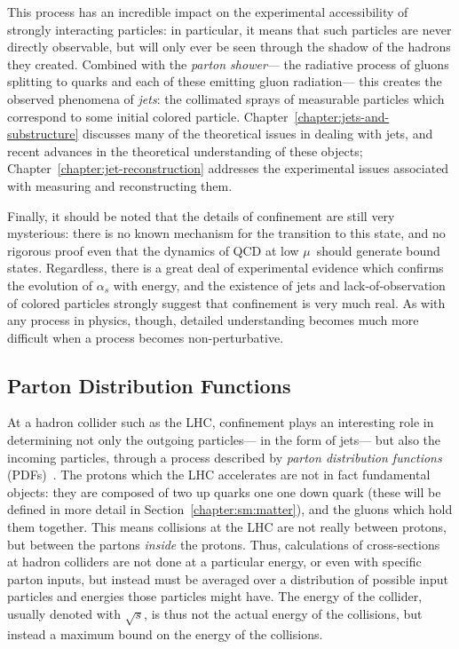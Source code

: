 This process has an incredible impact on the experimental accessibility of strongly interacting particles: in particular, it means that such particles are never directly observable, but will only ever be seen through the shadow of the hadrons they created. Combined with the \textit{parton shower}--- the radiative process of gluons splitting to quarks and each of these emitting gluon radiation--- this creates the observed phenomena of \textit{jets}: the collimated sprays of measurable particles which correspond to some initial colored particle. Chapter~\ref{chapter:jets-and-substructure} discusses many of the theoretical issues in dealing with jets, and recent advances in the theoretical understanding of these objects; Chapter~\ref{chapter:jet-reconstruction} addresses the experimental issues associated with measuring and reconstructing them.


Finally, it should be noted that the details of confinement are still very mysterious: there is no known mechanism for the transition to this state, and no rigorous proof even that the dynamics of QCD at low $\mu$~should generate bound states. Regardless, there is a great deal of experimental evidence which confirms the evolution of $\alpha_s$ with energy, and the existence of jets and lack-of-observation of colored particles strongly suggest that confinement is very much real. As with any process in physics, though, detailed understanding becomes much more difficult when a process becomes non-perturbative.

\subsection{Parton Distribution Functions}

At a hadron collider such as the LHC, confinement plays an interesting role in determining not only the outgoing particles--- in the form of jets--- but also the incoming particles, through a process described by \textit{parton distribution functions} (PDFs)~\cite{PhysRevD.30.49}. The protons which the LHC accelerates are not in fact fundamental objects: they are composed of two up quarks one one down quark (these will be defined in more detail in Section~\ref{chapter:sm:matter}), and the gluons which hold them together. This means collisions at the LHC are not really between protons, but between the partons \textit{inside} the protons. Thus, calculations of cross-sections at hadron colliders are not done at a particular energy, or even with specific parton inputs, but instead must be averaged over a distribution of possible input particles and energies those particles might have. The energy of the collider, usually denoted with $\sqrt{s}$, is thus not the actual energy of the collisions, but instead a maximum bound on the energy of the collisions.

